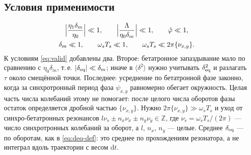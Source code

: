 \subsection{Условия применимости}

\begin{equation}
\label{eq:valid-L}
\begin{gathered}
\Bigl|\frac{\eta_1\delta_m}{\eta_0}\Bigr|\ll 1,
\qquad
\Bigl|\frac{\Lambda}{\eta_0\delta_m}\Bigr|\ll 1,
\qquad
\hat\varphi\ll 1,
\\
\delta_m\ll 1,
\qquad
\omega_s T_s\ll 1,
\qquad
\omega_s T_s\ll 2\pi\{\nu_{x,y}\}.
\end{gathered}
\end{equation}
К условиям \eqref{eq:valid} добавлены два. Второе: бетатронное запаздывание мало по сравнению с $\eta_0\delta_m$, т.\,е. $|\delta_{\mathrm{eq}}|\ll\delta_m$; иначе в $\langle\delta^2\rangle$ нужно учитывать $\delta_{\mathrm{eq}}^2$ и разлагать $\tau$ около смещённой точки. Последнее: усреднение по бетатронной фазе законно, когда за синхротронный период фаза $\psi_{x,y}$ равномерно обегает окружность. Целая часть числа колебаний этому не помогает: после целого числа оборотов фазы остаток определяется дробной частью $\{\nu_{x,y}\}$. Нужно $2\pi\{\nu_{x,y}\}\gg\omega_s T_s$ и уход от синхро-бетатронных резонансов $l\nu_s\pm n_x\nu_x\pm n_y\nu_y\in\mathbb{Z}$, где $\nu_s=\omega_sT_s/(2\pi)$ --- число синхротронных колебаний за оборот, а $l$, $n_x$, $n_y$ --- целые. Среднее $\delta_{\mathrm{eq}}$ --- по оборотам, как в \eqref{eq:deq-def}: это среднее по прохождениям резонатора, а не интеграл вдоль траектории с весом $\mathrm{d}t$.

